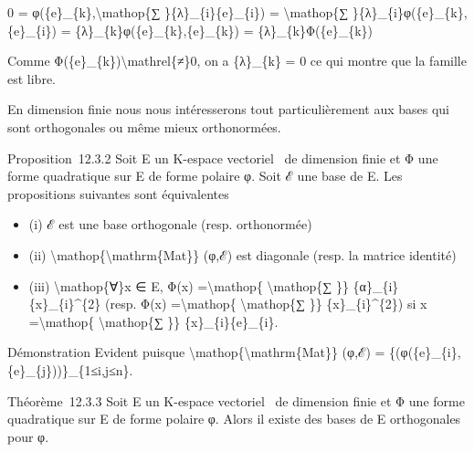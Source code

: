 \documentclass[]{article}
\begin{document}
0 = φ(\{e\}\_\{k\},\textbackslash{}mathop\{∑ \}\{λ\}\_\{i\}\{e\}\_\{i\})
= \textbackslash{}mathop\{∑ \}\{λ\}\_\{i\}φ(\{e\}\_\{k\},\{e\}\_\{i\}) =
\{λ\}\_\{k\}φ(\{e\}\_\{k\},\{e\}\_\{k\}) = \{λ\}\_\{k\}Φ(\{e\}\_\{k\})

Comme Φ(\{e\}\_\{k\})\textbackslash{}mathrel\{≠\}0, on a \{λ\}\_\{k\} =
0 ce qui montre que la famille est libre.

En dimension finie nous nous intéresserons tout particulièrement aux
bases qui sont orthogonales ou même mieux orthonormées.

Proposition~12.3.2 Soit E un K-espace vectoriel ~de dimension finie et Φ
une forme quadratique sur E de forme polaire φ. Soit ℰ une base de E.
Les propositions suivantes sont équivalentes

\begin{itemize}
\itemsep1pt\parskip0pt
\item
  (i) ℰ est une base orthogonale (resp. orthonormée)
\item
  (ii) \textbackslash{}mathop\{\textbackslash{}mathrm\{Mat\}\} (φ,ℰ) est
  diagonale (resp. la matrice identité)
\item
  (iii) \textbackslash{}mathop\{∀\}x ∈ E, Φ(x) =\textbackslash{}mathop\{
  \textbackslash{}mathop\{∑ \}\} \{α\}\_\{i\}\{x\}\_\{i\}\^{}\{2\}
  (resp. Φ(x) =\textbackslash{}mathop\{ \textbackslash{}mathop\{∑ \}\}
  \{x\}\_\{i\}\^{}\{2\}) si x =\textbackslash{}mathop\{
  \textbackslash{}mathop\{∑ \}\} \{x\}\_\{i\}\{e\}\_\{i\}.
\end{itemize}

Démonstration Evident puisque
\textbackslash{}mathop\{\textbackslash{}mathrm\{Mat\}\} (φ,ℰ) =
\{(φ(\{e\}\_\{i\},\{e\}\_\{j\}))\}\_\{1≤i,j≤n\}.

Théorème~12.3.3 Soit E un K-espace vectoriel ~de dimension finie et Φ
une forme quadratique sur E de forme polaire φ. Alors il existe des
bases de E orthogonales pour φ.
\end{document}
